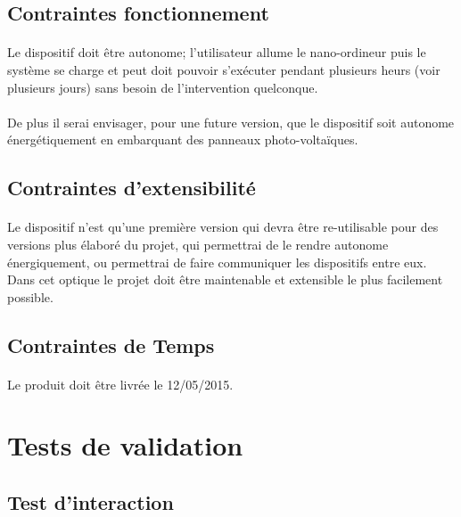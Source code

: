 \documentclass[a4paper, titlepage, oneside, 12pt]{article}%
\begin{document}
\subsection{Contraintes fonctionnement}
\paragraph{}
Le dispositif doit être autonome; l'utilisateur allume le nano-ordineur puis le système se charge et peut doit pouvoir s’exécuter pendant plusieurs heurs (voir plusieurs jours) sans besoin de l’intervention quelconque.

\paragraph{}
De plus il serai envisager, pour une future version, que le dispositif soit autonome énergétiquement en embarquant des panneaux photo-voltaïques.

\subsection{Contraintes d'extensibilité}
\paragraph{}
Le dispositif n'est qu'une première version qui devra être re-utilisable pour des versions plus élaboré du projet, qui permettrai de le rendre autonome énergiquement, ou permettrai de faire communiquer les dispositifs entre eux.\\ Dans cet optique le projet doit être maintenable et extensible le plus facilement possible.

\subsection{Contraintes de Temps}
\paragraph{}
Le produit doit être livrée le 12/05/2015.

\section{Tests de validation}

\subsection{Test d'interaction}
\end{document}
